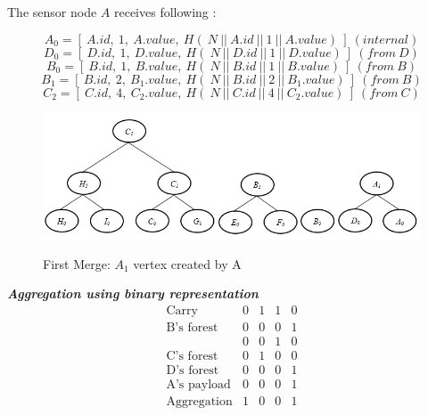 	The sensor node $A$ receives following \payloads:

	\begin{equation}
		A_{0} = [\ A.id,\ 1,\ A.value,\ H  (\ N\ ||\ A.id\ ||\ 1\ ||\ A.value)\ ]\ (internal)
	\end{equation}
	\begin{equation}
		D_{0} = [\ D.id,\ 1,\ D.value,\ H(\ N\ ||\ D.id\ ||\ 1\ ||\ D.value)\ ]\ (from\ D)
	\end{equation}
	\begin{equation}
		B_{0} = [\ B.id,\ 1,\ B.value,\ H(\ N\ ||\ B.id\ ||\ 1\ ||\ B.value)\ ]\ (from\ B)
	\end{equation}
	\begin{equation}
		B_{1} = [\ B.id,\ 2,\ B_{1}.value,\ H(\ N\ ||\ B.id\ ||\ 2\ ||\ B_{1}.value)\ ]\ (from\ B)
	\end{equation}
	\begin{equation}
		C_{2} = [\ C.id,\ 4,\ C_{2}.value,\ H(\ N\ ||\ C.id\ ||\ 4\ ||\ C_{2}.value)\ ]\ (from\ C)
	\end{equation}
	
	\begin{figure}[hp]
		\centering
		\includegraphics[scale = 0.7]{images/commitment-tree-example-2.png}\\
		\caption{First Merge: $A_{1}$ vertex created by A}
	\end{figure}


	\textit{\textbf{ Aggregation using binary representation}}
	\[ 
		\begin{array}{lcccc}
			\mbox{Carry} & 0 & 1 & 1 & 0\\
			\hline
			\mbox{B's forest} & 0 & 0 & 0 & 1 \\
			\mbox{ } & 0 & 0 & 1 & 0 \\
			\hline
			\mbox{C's forest} & 0 & 1 & 0 & 0 \\
			\hline
			\mbox{D's forest} & 0 & 0 & 0 & 1 \\
			\hline
			\mbox{A's payload} & 0 & 0 & 0 & 1 \\
			\hline
			\mbox{Aggregation} & 1 & 0 & 0 & 1 
		\end{array}
	\] 


